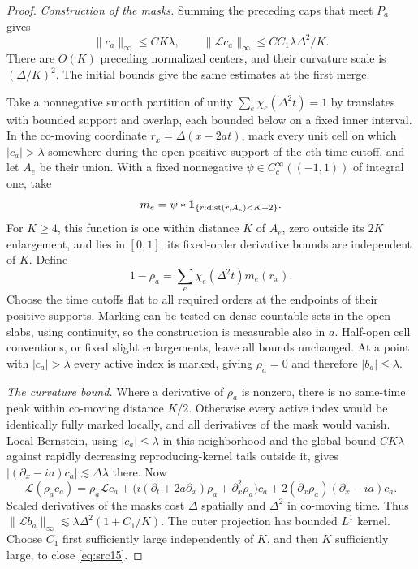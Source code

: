 \begin{proof}
\emph{Construction of the masks.}
Summing the preceding caps that meet $P_a$ gives
\begin{equation}\label{eq:frame-incoming}
 \|c_a\|_\infty\leq CK\lambda,\qquad
 \|\mathcal Lc_a\|_\infty
 \leq CC_1\lambda\Delta^2/K.
\end{equation}
There are $O(K)$ preceding normalized centers, and their curvature
scale is $(\Delta/K)^2$.  The initial bounds give the same estimates
at the first merge.

Take a nonnegative smooth partition of unity
$\sum_e\chi_e(\Delta^2t)=1$ by translates with bounded support and
overlap, each bounded below on a fixed inner interval.  In the
co-moving coordinate $r_x=\Delta(x-2at)$, mark every unit cell on which
$|c_a|>\lambda$ somewhere during the open positive support of the
$e$th time cutoff, and let $A_e$ be their union.  With a fixed
nonnegative $\psi\in C_c^\infty((-1,1))$ of integral one, take
\[
 m_e=\psi*\mathbf1_{\{r:\operatorname{dist}(r,A_e)<K+2\}}.
\]
For $K\geq4$, this function is one within distance $K$ of $A_e$,
zero outside its $2K$ enlargement, and lies in $[0,1]$; its fixed-order
derivative bounds are independent of $K$.  Define
\[
 1-\rho_a=\sum_e\chi_e(\Delta^2t)m_e(r_x).
\]
Choose the time cutoffs flat to all required orders at the endpoints
of their positive supports.  Marking can be tested on dense countable
sets in the open slabs, using continuity, so the construction is
measurable also in $a$.  Half-open cell conventions, or fixed slight
enlargements, leave all bounds unchanged.  At a point with
$|c_a|>\lambda$ every active index is marked, giving $\rho_a=0$ and
therefore $|b_a|\leq\lambda$.

\emph{The curvature bound.}
Where a derivative of $\rho_a$ is nonzero, there is no same-time peak
within co-moving distance $K/2$.  Otherwise every active index would
be identically fully marked locally, and all derivatives of the mask
would vanish.  Local Bernstein, using $|c_a|\leq\lambda$ in this
neighborhood and the global bound $CK\lambda$ against rapidly
decreasing reproducing-kernel tails outside it, gives
$|(\partial_x-ia)c_a|\lesssim\Delta\lambda$ there.  Now
\[
 \mathcal L(\rho_ac_a)=\rho_a\mathcal Lc_a+
 \bigl(i(\partial_t+2a\partial_x)\rho_a+
                  \partial_x^2\rho_a\bigr)c_a
 +2(\partial_x\rho_a)(\partial_x-ia)c_a.
\]
Scaled derivatives of the masks cost $\Delta$ spatially and
$\Delta^2$ in co-moving time.  Thus
$\|\mathcal Lb_a\|_\infty\lesssim
\lambda\Delta^2(1+C_1/K)$.
The outer projection has bounded $L^1$ kernel.  Choose $C_1$ first
sufficiently large independently of $K$, and then $K$ sufficiently
large, to close \eqref{eq:src15}.


\end{proof}
